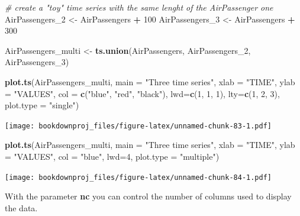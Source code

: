 \documentclass[
]{article}
\newenvironment{Shaded}{\begin{snugshade}}{\end{snugshade}}
\newcommand{\CommentTok}[1]{\textcolor[rgb]{0.56,0.35,0.01}{\textit{#1}}}
\newcommand{\DataTypeTok}[1]{\textcolor[rgb]{0.13,0.29,0.53}{#1}}
\newcommand{\DecValTok}[1]{\textcolor[rgb]{0.00,0.00,0.81}{#1}}
\newcommand{\KeywordTok}[1]{\textcolor[rgb]{0.13,0.29,0.53}{\textbf{#1}}}
\newcommand{\NormalTok}[1]{#1}
\newcommand{\OperatorTok}[1]{\textcolor[rgb]{0.81,0.36,0.00}{\textbf{#1}}}
\newcommand{\StringTok}[1]{\textcolor[rgb]{0.31,0.60,0.02}{#1}}
\begin{document}
\begin{Shaded}
\begin{Highlighting}[]
\CommentTok{# create a "toy" time series with the same lenght of the AirPassenger one}
\NormalTok{AirPassengers_}\DecValTok{2}\NormalTok{ <-}\StringTok{ }\NormalTok{AirPassengers }\OperatorTok{+}\StringTok{ }\DecValTok{100}
\NormalTok{AirPassengers_}\DecValTok{3}\NormalTok{ <-}\StringTok{ }\NormalTok{AirPassengers }\OperatorTok{+}\StringTok{ }\DecValTok{300}

\NormalTok{AirPassengers_multi <-}\StringTok{ }\KeywordTok{ts.union}\NormalTok{(AirPassengers, AirPassengers_}\DecValTok{2}\NormalTok{, AirPassengers_}\DecValTok{3}\NormalTok{)}

\KeywordTok{plot.ts}\NormalTok{(AirPassengers_multi, }
        \DataTypeTok{main =} \StringTok{"Three time series"}\NormalTok{,}
        \DataTypeTok{xlab =} \StringTok{"TIME"}\NormalTok{, }\DataTypeTok{ylab =} \StringTok{"VALUES"}\NormalTok{,}
        \DataTypeTok{col =} \KeywordTok{c}\NormalTok{(}\StringTok{"blue"}\NormalTok{, }\StringTok{"red"}\NormalTok{, }\StringTok{"black"}\NormalTok{), }
        \DataTypeTok{lwd=}\KeywordTok{c}\NormalTok{(}\DecValTok{1}\NormalTok{, }\DecValTok{1}\NormalTok{, }\DecValTok{1}\NormalTok{), }\DataTypeTok{lty=}\KeywordTok{c}\NormalTok{(}\DecValTok{1}\NormalTok{, }\DecValTok{2}\NormalTok{, }\DecValTok{3}\NormalTok{),}
        \DataTypeTok{plot.type =} \StringTok{"single"}\NormalTok{)}
\end{Highlighting}
\end{Shaded}

\texttt{[image: bookdownproj\_files/figure-latex/unnamed-chunk-83-1.pdf]}

\begin{Shaded}
\begin{Highlighting}[]
\KeywordTok{plot.ts}\NormalTok{(AirPassengers_multi, }
        \DataTypeTok{main =} \StringTok{"Three time series"}\NormalTok{,}
        \DataTypeTok{xlab =} \StringTok{"TIME"}\NormalTok{, }\DataTypeTok{ylab =} \StringTok{"VALUES"}\NormalTok{,}
        \DataTypeTok{col =} \StringTok{"blue"}\NormalTok{, }
        \DataTypeTok{lwd=}\DecValTok{4}\NormalTok{,}
        \DataTypeTok{plot.type =} \StringTok{"multiple"}\NormalTok{)}
\end{Highlighting}
\end{Shaded}

\texttt{[image: bookdownproj\_files/figure-latex/unnamed-chunk-84-1.pdf]}

With the parameter \textbf{nc} you can control the number of columns used to display the data.
\end{document}

